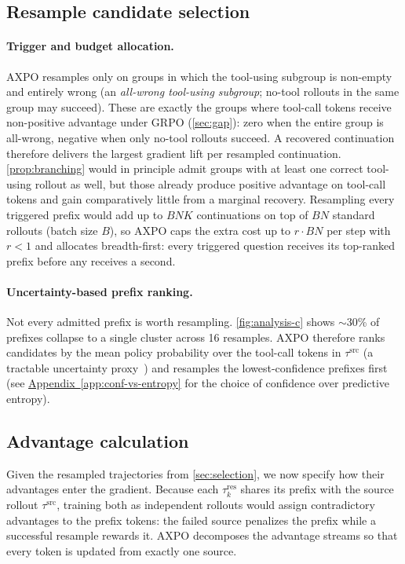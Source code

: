 \documentclass{llmxive}
\providecommand{\appref}[1]{\hyperref[#1]{Appendix~\ref*{#1}}}
\begin{document}
\subsection{Resample candidate selection}
\label{sec:selection}

\paragraph{Trigger and budget allocation.}
AXPO resamples only on groups in which the tool-using subgroup is non-empty and entirely wrong (an \emph{all-wrong tool-using subgroup}; no-tool rollouts in the same group may succeed). These are exactly the groups where tool-call tokens receive non-positive advantage under GRPO (\autoref{sec:gap}): zero when the entire group is all-wrong, negative when only no-tool rollouts succeed. A recovered continuation therefore delivers the largest gradient lift per resampled continuation. \autoref{prop:branching} would in principle admit groups with at least one correct tool-using rollout as well, but those already produce positive advantage on tool-call tokens and gain comparatively little from a marginal recovery. Resampling every triggered prefix would add up to $BNK$ continuations on top of $BN$ standard rollouts (batch size $B$), so AXPO caps the extra cost up to $r \cdot BN$ per step with $r < 1$ and allocates breadth-first: every triggered question receives its top-ranked prefix before any receives a second.

\paragraph{Uncertainty-based prefix ranking.}
Not every admitted prefix is worth resampling. \autoref{fig:analysis-c} shows $\sim$30\% of prefixes collapse to a single cluster across 16 resamples. AXPO therefore ranks candidates by the mean policy probability over the tool-call tokens in $\tau^{\text{src}}$ (a tractable uncertainty proxy~\citep{deepconf}) and resamples the lowest-confidence prefixes first (see \appref{app:conf-vs-entropy} for the choice of confidence over predictive entropy).

\subsection{Advantage calculation}
\label{sec:credit}

Given the resampled trajectories from \autoref{sec:selection}, we now specify how their advantages enter the gradient. Because each $\tau_k^{\text{res}}$ shares its prefix with the source rollout $\tau^{\text{src}}$, training both as independent rollouts would assign contradictory advantages to the prefix tokens: the failed source penalizes the prefix while a successful resample rewards it. AXPO decomposes the advantage streams so that every token is updated from exactly one source.
\end{document}
